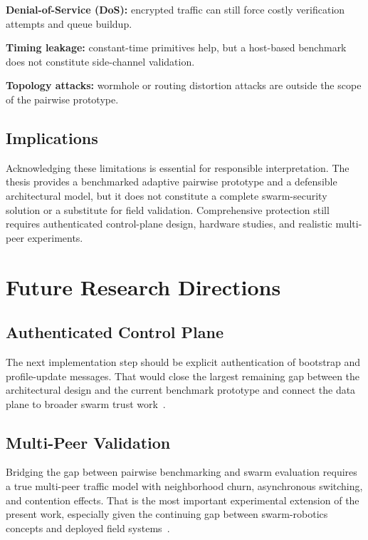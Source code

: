 \textbf{Denial-of-Service (DoS):} encrypted traffic can still force costly verification attempts and queue buildup.

\textbf{Timing leakage:} constant-time primitives help, but a host-based benchmark does not constitute side-channel validation.

\textbf{Topology attacks:} wormhole or routing distortion attacks are outside the scope of the pairwise prototype.

\subsection*{Implications}

Acknowledging these limitations is essential for responsible interpretation. The thesis provides a benchmarked adaptive pairwise prototype and a defensible architectural model, but it does not constitute a complete swarm-security solution or a substitute for field validation. Comprehensive protection still requires authenticated control-plane design, hardware studies, and realistic multi-peer experiments.

\section{Future Research Directions}
\label{sec:future_work}

\subsection*{Authenticated Control Plane}

The next implementation step should be explicit authentication of bootstrap and profile-update messages. That would close the largest remaining gap between the architectural design and the current benchmark prototype and connect the data plane to broader swarm trust work~\cite{chenSecuringEmergentBehaviour2021,kohliSwarmNetFirmwareAttestation2024}.

\subsection*{Multi-Peer Validation}

Bridging the gap between pairwise benchmarking and swarm evaluation requires a true multi-peer traffic model with neighborhood churn, asynchronous switching, and contention effects. That is the most important experimental extension of the present work, especially given the continuing gap between swarm-robotics concepts and deployed field systems~\cite{kegeleirsTowardsAppliedSwarm2025}.

